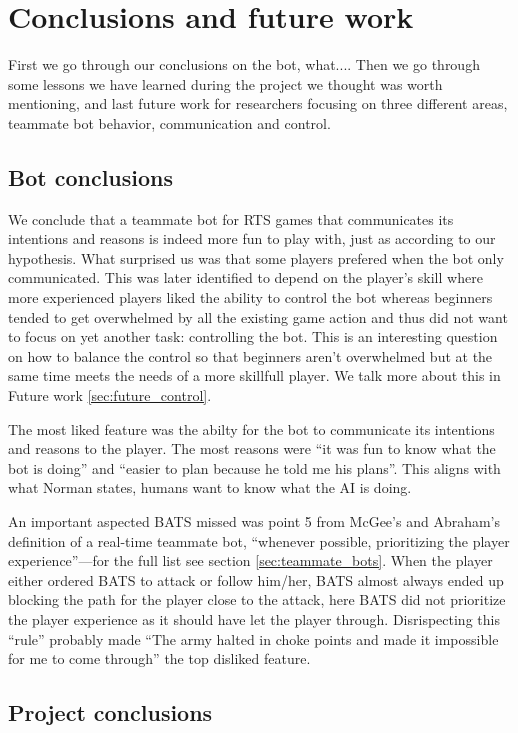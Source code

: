 \chapter{Conclusions and future work}
First we go through our conclusions on the bot, what.... Then we go through some lessons we have learned during the project we thought was worth mentioning, and last future work for researchers focusing on three different areas, teammate bot behavior, communication and control.

\section{Bot conclusions}
We conclude that a teammate bot for RTS games that communicates its intentions and reasons is indeed more fun to play with, just as according to our hypothesis. What surprised us was that some players prefered when the bot only communicated. This was later identified to depend on the player's skill where more experienced players liked the ability to control the bot whereas beginners tended to get overwhelmed by all the existing game action and thus did not want to focus on yet another task: controlling the bot. This is an interesting question on how to balance the control so that beginners aren't overwhelmed but at the same time meets the needs of a more skillfull player. We talk more about this in Future work \ref{sec:future_control}.

The most liked feature was the abilty for the bot to communicate its intentions and reasons to the player. The most reasons were ``it was fun to know what the bot is doing'' and ``easier to plan because he told me his plans''. This aligns with what Norman states, humans want to know what the AI is doing\cite{norman07}.

An important aspected BATS missed was point 5 from McGee's and Abraham's definition\cite{mcgee10} of a real-time teammate bot, ``whenever possible, prioritizing the player experience''—for the full list see section \ref{sec:teammate_bots}. When the player either ordered BATS to attack or follow him/her, BATS almost always ended up blocking the path for the player close to the attack, here BATS did not prioritize the player experience as it should have let the player through. Disrispecting this ``rule'' probably made ``The army halted in choke points and made it impossible for me to come through'' the top disliked feature.

\section{Project conclusions}
